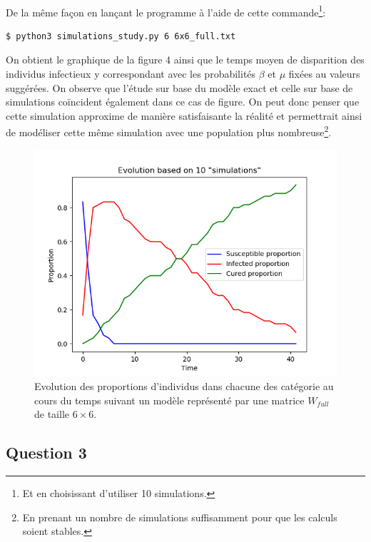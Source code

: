 \documentclass[a4paper, 12pt, oneside]{article}
\begin{document}
\paragraph{}De la même façon en lançant le programme à l'aide de cette commande\footnote{Et en choisissant d'utiliser 10 simulations.}:
\begin{lstlisting}[language=bash]
$ python3 simulations_study.py 6 6x6_full.txt 
\end{lstlisting}

\noindent On obtient le graphique de la figure 4 ainsi que le temps moyen de disparition des individus infectieux y correspondant avec les probabilités $\beta$ et $\mu$ fixées au valeurs suggérées. On observe que l'étude sur base du modèle exact et celle sur base de simulations coïncident également dans ce cas de figure. On peut donc penser que cette simulation approxime de manière satisfaisante la réalité et permettrait ainsi de modéliser cette même simulation avec une population plus nombreuse\footnote{En prenant un nombre de simulations suffisamment pour que les calculs soient stables.}.

\begin{figure}[H]
	\centering
	\includegraphics[scale=1]{full_6x6_simulations.png} 
	\caption{Evolution des proportions d'individus dans chacune des catégorie au cours du temps suivant un modèle représenté par une matrice $W_{full}$ de taille $6 \times 6$.}
\end{figure}

\subsection{Question 3}
\end{document}
